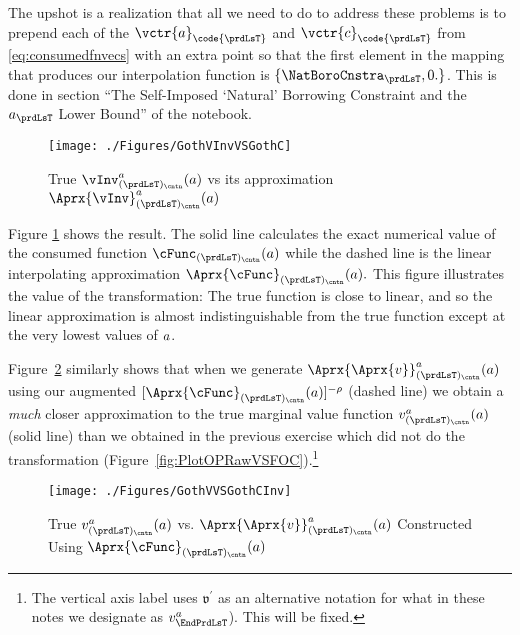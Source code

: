 \documentclass[SolvingMicroDSOPs]{subfiles}
\begin{document}
The upshot is a realization that all we need to do to address these problems is to prepend each of the $\vctr{a}_{\code{\prdLsT}}$ and $\vctr{c}_{\code{\prdLsT}}$ from \eqref{eq:consumedfnvecs} with an extra point so that the first element in the mapping that produces our interpolation function is $\{\NatBoroCnstra_{\prdLsT},0.\}$. This is done in section ``The Self-Imposed `Natural' Borrowing Constraint and the $a_{\prdLsT}$ Lower Bound'' of the notebook.%


\hypertarget{GothVInvVSGothC}{}
\begin{figure}
  \centerline{\texttt{[image: ./Figures/GothVInvVSGothC]}}
  \caption{True $\vInv^{a}_{(\prdLsT)_\cntn}(\aNrm)$ vs its approximation $\Aprx{\vInv}^{a}_{(\prdLsT)_\cntn}(\aNrm)$}
  \label{fig:GothVInvVSGothC}
\end{figure}

Figure \ref{fig:GothVInvVSGothC} shows the result. The solid line calculates the exact numerical value of the consumed function $\cFunc_{(\prdLsT)_\cntn}(\aNrm)$ while the dashed line is the linear interpolating approximation $\Aprx{\cFunc}_{(\prdLsT)_\cntn}(\aNrm).$ This figure illustrates the value of the transformation: The true function is close to linear, and so the linear approximation is almost indistinguishable from the true function except at the very lowest values of $a$.

Figure~\ref{fig:GothVVSGothCInv} similarly shows that when we generate $\Aprx{\Aprx{\vFunc}}_{(\prdLsT)_\cntn}^{a}(a)$ using our augmented $[\Aprx{\cFunc}_{(\prdLsT)_\cntn}(a)]^{-\CRRA}$ (dashed line) we obtain a \textit{much} closer approximation to the true marginal value function $\vFunc^{a}_{(\prdLsT)_\cntn}(a)$ (solid line) than we obtained in the previous exercise which did not do the transformation (Figure~\ref{fig:PlotOPRawVSFOC}).\footnote{The vertical axis label uses $\mathfrak{v}^{\prime}$ as an alternative notation for what in these notes we designate as $\vFunc^{a}_{\EndPrdLsT}$).  This will be fixed.}

\hypertarget{GothVVSGothCInv}{}
\begin{figure}
  \centerline{\texttt{[image: ./Figures/GothVVSGothCInv]}}
  \caption{True $\vFunc^{a}_{(\prdLsT)_\cntn}(\aNrm)$ vs. $\Aprx{\Aprx{\vFunc}}_{(\prdLsT)_\cntn}^{a}(\aNrm)$ Constructed Using $\Aprx{\cFunc}_{(\prdLsT)_\cntn}(\aNrm)$}
  \label{fig:GothVVSGothCInv}
\end{figure}
\end{document}

